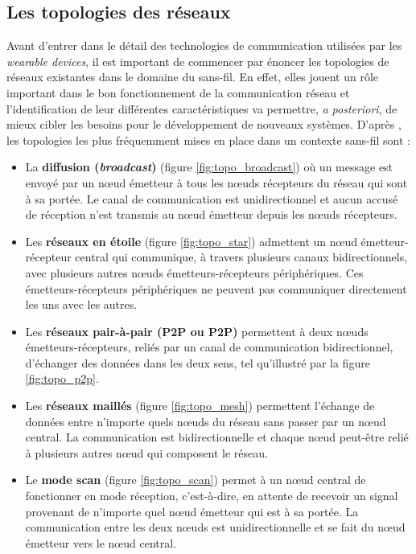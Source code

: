 \subsection{Les topologies des réseaux}
\label{sec:topo}

Avant d'entrer dans le détail des technologies de communication utilisées par les \textit{wearable devices}, il est important de commencer par énoncer les topologies de réseaux existantes dans le domaine du sans-fil. En effet, elles jouent un rôle important dans le bon fonctionnement de la communication réseau et l'identification de leur différentes caractéristiques va permettre, \textit{a posteriori}, de mieux cibler les besoins pour le développement de nouveaux systèmes. D'après \cite{Tanenbaum2011}, les topologies les plus fréquemment mises en place dans un contexte sans-fil sont :

\begin{itemize}[label=\textbullet]
	\item
	      La \textbf{diffusion (\textit{broadcast})} (figure \ref{fig:topo_broadcast}) où un message est envoyé par un n\oe{}ud émetteur à tous les n\oe{}uds récepteurs du réseau qui sont à sa portée. Le canal de communication est unidirectionnel et aucun accusé de réception n'est transmis au n\oe{}ud émetteur depuis les n\oe{}uds récepteurs.
	\item
          Les \textbf{réseaux en étoile} (figure \ref{fig:topo_star}) admettent un n\oe{}ud émetteur-récepteur central qui communique, à travers plusieurs canaux bidirectionnels, avec plusieurs autres n\oe{}uds émetteurs-récepteurs périphériques. Ces émetteurs-récepteurs périphériques ne peuvent pas communiquer directement les uns avec les autres.
    \item
        Les \textbf{réseaux pair-à-pair (\acl{P2P} ou \acs{P2P})} permettent à deux n\oe{}uds émet\-teurs-récepteurs, reliés par un canal de communication bidirectionnel, d'échanger des données dans les deux sens, tel qu'illustré par la figure \ref{fig:topo_p2p}.
    \item
        Les \textbf{réseaux maillés} (figure \ref{fig:topo_mesh}) permettent l'échange de données entre n'importe quels n\oe{}uds du réseau sans passer par un n\oe{}ud central. La communication est bidirectionnelle et chaque n\oe{}ud peut-être relié à plusieurs autres n\oe{}ud qui composent le réseau.
    \item
        Le \textbf{mode scan} (figure \ref{fig:topo_scan}) permet à un n\oe{}ud central de fonctionner en mode réception, c'est-à-dire, en attente de recevoir un signal provenant de n'importe quel n\oe{}ud émetteur qui est à sa portée. La communication entre les deux n\oe{}uds est unidirectionnelle et se fait du n\oe{}ud émetteur vers le n\oe{}ud central.
\end{itemize}


